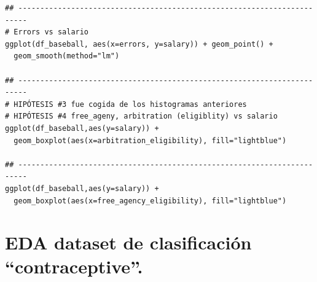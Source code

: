 \documentclass[a4paper,12pt, oneside]{book}
\begin{document}
\begin{verbatim}
## ------------------------------------------------------------------------
# Errors vs salario
ggplot(df_baseball, aes(x=errors, y=salary)) + geom_point() + 
  geom_smooth(method="lm")

## ------------------------------------------------------------------------
# HIPÓTESIS #3 fue cogida de los histogramas anteriores
# HIPÓTESIS #4 free_ageny, arbitration (eligiblity) vs salario
ggplot(df_baseball,aes(y=salary)) + 
  geom_boxplot(aes(x=arbitration_eligibility), fill="lightblue")

## ------------------------------------------------------------------------
ggplot(df_baseball,aes(y=salary)) + 
  geom_boxplot(aes(x=free_agency_eligibility), fill="lightblue")
\end{verbatim}
\newpage
\section{EDA dataset de clasificación ``contraceptive''.}
\end{document}
